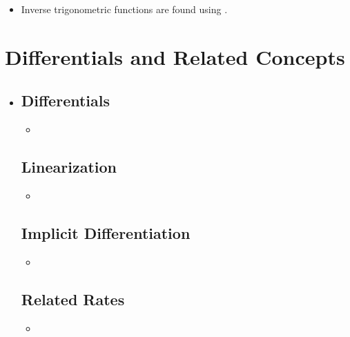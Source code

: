 \begin{itemize}
\begin{itemize}
    \item Inverse trigonometric functions are found using .

  \end{itemize}

\end{itemize}


\section{Differentials and Related Concepts}
\begin{itemize}
  \item

  \subsection{Differentials}
  \begin{itemize}
    \item
  \end{itemize}

  \subsection{Linearization}
  \begin{itemize}
    \item
  \end{itemize}

  \subsection{Implicit Differentiation}
  \begin{itemize}
    \item
  \end{itemize}

  \subsection{Related Rates}
  \begin{itemize}
    \item
  \end{itemize}

\end{itemize}
